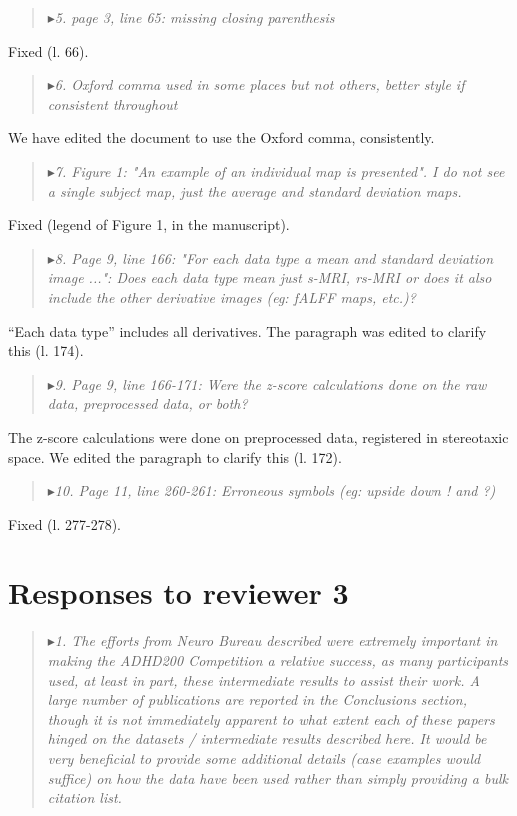 \documentclass[authoryear,3p]{elsarticle}
\begin{document}
\begin{quote}
$\blacktriangleright$\emph{5. page 3, line 65: missing closing parenthesis}
\end{quote}

Fixed (l. 66).

\begin{quote}
$\blacktriangleright$\emph{6. Oxford comma used in some places but not others, better style if consistent throughout}
\end{quote}

We have edited the document to use the Oxford comma, consistently.

\begin{quote}
$\blacktriangleright$\emph{7. Figure 1: "An example of an individual map is presented". I do not see a single subject map, just the average and standard deviation maps.}
\end{quote}

Fixed (legend of Figure 1, in the manuscript). 

\begin{quote}
$\blacktriangleright$\emph{8.  Page 9, line 166: "For each data type a mean and standard deviation image ...": Does each data type mean just {s-MRI, rs-MRI} or does it also include the other derivative images (eg: fALFF maps, etc.)?}
\end{quote}

``Each data type'' includes all derivatives. The paragraph was edited to clarify this (l. 174). 

\begin{quote}
$\blacktriangleright$\emph{9. Page 9, line 166-171: Were the z-score calculations done on the raw data, preprocessed data, or both?}
\end{quote}

The z-score calculations were done on preprocessed data, registered in stereotaxic space. We edited the paragraph to clarify this (l. 172). 

\begin{quote}
$\blacktriangleright$\emph{10. Page 11, line 260-261: Erroneous symbols (eg: upside down ! and ?)}
\end{quote}

Fixed (l. 277-278).

\section{Responses to reviewer 3}

\begin{quote}
$\blacktriangleright$\emph{1. The efforts from Neuro Bureau described were extremely important in making the ADHD200 Competition a relative success, as many participants used, at least in part, these intermediate results to assist their work. A large number of publications are reported in the Conclusions section, though it is not immediately apparent to what extent each of these papers hinged on the datasets / intermediate results described here.  It would be very beneficial to provide some additional details (case examples would suffice) on how the data have been used rather than simply providing a bulk citation list. 
}
\end{quote}
\end{document}
